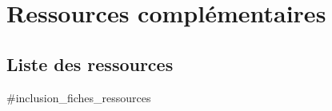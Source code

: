 


\section{Ressources complémentaires}

\subsection*{Liste des ressources}



\newpage


 \label{subsec:FichesRessourcesComplementaires}
\addtocounter{subsection}{1}

#inclusion_fiches_ressources

